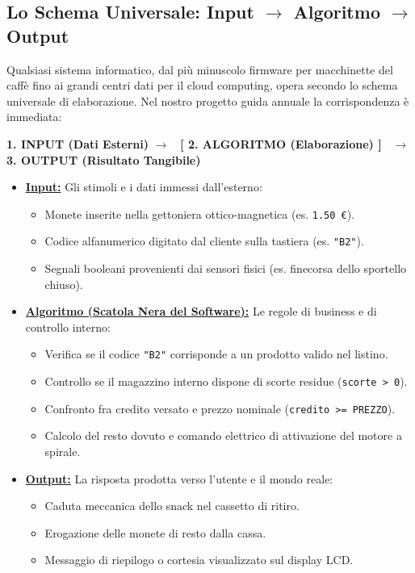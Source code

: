 \subsection{Lo Schema Universale: \texorpdfstring{Input $\to$ Algoritmo $\to$ Output}{Input -> Algoritmo -> Output}}

Qualsiasi sistema informatico, dal più minuscolo firmware per macchinette del caffè fino ai grandi centri dati per il cloud computing, opera secondo lo schema universale di elaborazione. Nel nostro progetto guida annuale la corrispondenza è immediata:

\begin{center}
\begin{tcolorbox}[colback=white,colframe=PiazzaGray!40,width=0.96\textwidth,arc=2mm,halign=center]
\textbf{\color{BoxAmber}1. INPUT (Dati Esterni)} $\longrightarrow$ 
\colorbox{PiazzaPrimary!10}{\textbf{\color{PiazzaPrimary}~[ 2. ALGORITMO (Elaborazione) ]~}} $\longrightarrow$ 
\textbf{\color{BoxGreen}3. OUTPUT (Risultato Tangibile)}
\end{tcolorbox}
\end{center}

\begin{itemize}
  \item \textbf{\underline{Input:}} Gli stimoli e i dati immessi dall'esterno:
  \begin{itemize}
    \item Monete inserite nella gettoniera ottico-magnetica (es. \texttt{1.50\,\euro}).
    \item Codice alfanumerico digitato dal cliente sulla tastiera (es. \texttt{"B2"}).
    \item Segnali booleani provenienti dai sensori fisici (es. finecorsa dello sportello chiuso).
  \end{itemize}
  \item \textbf{\underline{Algoritmo (Scatola Nera del Software):}} Le regole di business e di controllo interno:
  \begin{itemize}
    \item Verifica se il codice \texttt{"B2"} corrisponde a un prodotto valido nel listino.
    \item Controllo se il magazzino interno dispone di scorte residue (\texttt{scorte > 0}).
    \item Confronto fra credito versato e prezzo nominale (\texttt{credito >= PREZZO}).
    \item Calcolo del resto dovuto e comando elettrico di attivazione del motore a spirale.
  \end{itemize}
  \item \textbf{\underline{Output:}} La risposta prodotta verso l'utente e il mondo reale:
  \begin{itemize}
    \item Caduta meccanica dello snack nel cassetto di ritiro.
    \item Erogazione delle monete di resto dalla cassa.
    \item Messaggio di riepilogo o cortesia visualizzato sul display LCD.
  \end{itemize}
\end{itemize}


